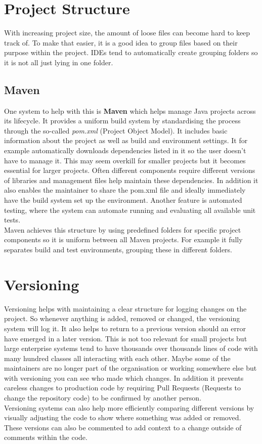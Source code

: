 \documentclass{article}
\begin{document}
	\section{Project Structure}
	With increasing project size, the amount of loose files can become hard to keep track of. To make that easier, it is a good idea to group files based on their purpose within the project. IDEs tend to automatically create grouping folders so it is not all just lying in one folder.
	\subsection{Maven}
	One system to help with this is \textbf{Maven} which helps manage Java projects across its lifecycle. It provides a uniform build system by standardising the process through the so-called \textit{pom.xml} (Project Object Model). It includes basic information about the project as well as build and environment settings. It for example automatically downloads dependencies listed in it so the user doesn't have to manage it. This may seem overkill for smaller projects but it becomes essential for larger projects. Often different components require different versions of libraries and management files help maintain these dependencies. In addition it also enables the maintainer to share the pom.xml file and ideally immediately have the build system set up the environment. Another feature is automated testing, where the system can automate running and evaluating all available unit tests. \\
	Maven achieves this structure by using predefined folders for specific project components so it is uniform between all Maven projects. For example it fully separates build and test environments, grouping these in different folders.
	\section{Versioning}
	Versioning helps with maintaining a clear structure for logging changes on the project. So whenever anything is added, removed or changed, the versioning system will log it. It also helps to return to a previous version should an error have emerged in a later version. This is not too relevant for small projects but large enterprise systems tend to have thousands over thousands lines of code with many hundred classes all interacting with each other. Maybe some of the maintainers are no longer part of the organisation or working somewhere else but with versioning you can see who made which changes. In addition it prevents careless changes to production code by requiring Pull Requests (Requests to change the repository code) to be confirmed by another person. \\
	Versioning systems can also help more efficiently comparing different versions by visually adjusting the code to show where something was added or removed. These versions can also be commented to add context to a change outside of comments within the code.
\end{document}
